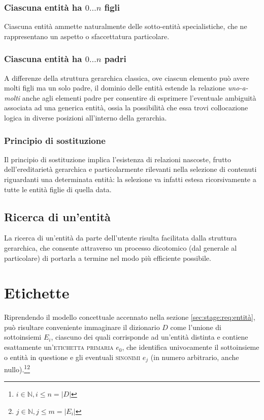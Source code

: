 \documentclass[10pt,a4paper,headinclude,footinclude,hidelinks]{scrreprt} %
\begin{document}
	\subsubsection{Ciascuna entit\`a ha $0\ldots n$ figli}
	Ciascuna entità ammette naturalmente delle sotto-entità specialistiche, che ne rappresentano un aspetto o sfaccettatura particolare.
	\subsubsection{Ciascuna entit\`a ha $0\ldots n$ padri}
	A differenze della struttura gerarchica classica, ove ciascun elemento può avere molti figli ma un solo padre, il dominio delle entità estende la relazione \textit{uno-a-molti} anche agli elementi padre per consentire di esprimere l'eventuale ambiguità associata ad una generica entità, ossia la possibilità che essa trovi collocazione logica in diverse posizioni all'interno della gerarchia.
	\subsubsection{Principio di sostituzione}
	Il principio di sostituzione implica l'esistenza di relazioni nascoste, frutto dell'ereditarietà gerarchica e particolarmente rilevanti nella selezione di contenuti riguardanti una determinata entità: la selezione va infatti estesa ricorsivamente a tutte le entità figlie di quella data.   
	\subsection{Ricerca di un'entit\`a}
	La ricerca di un'entità da parte dell'utente risulta facilitata dalla struttura gerarchica, che consente attraverso un processo dicotomico (dal generale al particolare) di portarla a termine nel modo più efficiente possibile. 

	\section{Etichette}
	\label{sec:stage:req:etichette}
	
	Riprendendo il modello concettuale accennato nella sezione \ref{sec:stage:req:entità}, può risultare conveniente immaginare il dizionario $D$ come l'unione di sottoinsiemi $E_i$, ciascuno dei quali corrisponde ad un'entità distinta e contiene esattamente un'\textsc{etichetta primaria} $e_0$, che identifica univocamente il sottoinsieme o entità in questione e gli eventuali \textsc{sinonimi} $e_j$ (in numero arbitrario, anche nullo).\footnote{$i \in \mathbb{N}, i \leq n=\left|D\right|$}\footnote{$j \in \mathbb{N}, j \leq m=\left|E_i\right|$}
\end{document}
